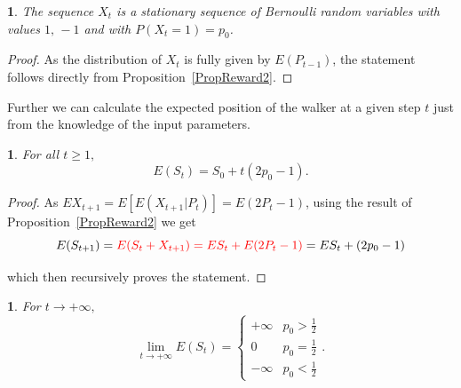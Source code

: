 \documentclass{amsart}
\theoremstyle{definition}
\theoremstyle{plain}
\newtheorem{prop}[thm]{\protect\propositionname}
\theoremstyle{plain}
\newtheorem{cor}[thm]{\protect\corollaryname}
\theoremstyle{plain}
\numberwithin{equation}{section}
\providecommand{\corollaryname}{Corollary}
\providecommand{\propositionname}{Proposition}
\begin{document}
    \begin{prop}
        The sequence $X_t$ is a stationary sequence of Bernoulli random
        variables with values $1,\,-1$ and with $P(X_t=1)=p_0$.
    \end{prop}
    \begin{proof}
        As the distribution of $X_t$ is fully given by $E(P_{t-1})$, the
        statement follows directly from Proposition~\ref{PropReward2}.
    \end{proof}

    {\color{red}Further we can} calculate the expected position of the walker at a given step $t$ just from the knowledge of the input parameters.

    \begin{prop}
        For all $t\geq1,$
        \[
            E(S_{t})=S_{0}+t(2p_{0}-1).
        \]
    \end{prop}
    \begin{proof}
    {\color{red}As $EX_{t+1}=E[E(X_{t+1}|P_t)]=E(2P_t -1)$, u}sing the result of Proposition~\ref{PropReward2} we get
        \[
            E(S_{t+1})= {\color{red}E(S_{t}+X_{t+1}) = ES_{t}+E(2P_{ \color{red}t}-1)}=
            ES_{t}+(2p_{0}-1)
        \]

        which then recursively proves the statement.
    \end{proof}

    \begin{cor}
        For $t\rightarrow+\infty,$ \textup{
            \[
                \lim_{t\to+\infty}E(S_{t})=\begin{cases}
                                               +\infty & p_{0}>\frac{1}{2}\\
                                               0 & p_{0}=\frac{1}{2}\\
                                               -\infty & p_{0}<\frac{1}{2}
                \end{cases}.
            \]
        }
    \end{cor}
\end{document}
